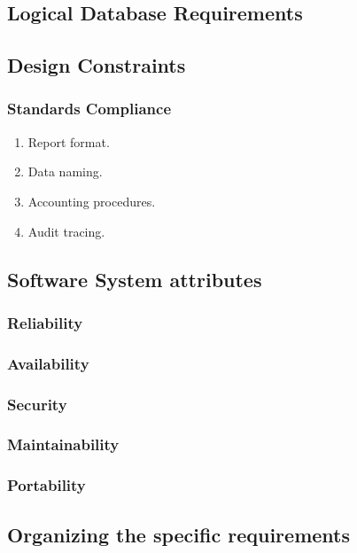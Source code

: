 \documentclass[onecolumn, draftclsnofoot,10pt, compsoc]{IEEEtran}
\begin{document}
\subsection{Logical Database Requirements}

\subsection{Design Constraints}

\subsubsection{Standards Compliance}
\begin{enumerate}
\item Report format.
\item Data naming.
\item Accounting procedures.
\item Audit tracing.

\end{enumerate}

\subsection{Software System attributes}

\subsubsection{Reliability}

\subsubsection{Availability}

\subsubsection{Security}

\subsubsection{Maintainability}

\subsubsection{Portability}

\subsection{Organizing the specific requirements}
\end{document}
